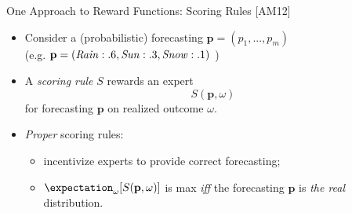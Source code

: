 \begin{frame}{One Approach to Reward Functions: Scoring Rules [AM12]}

\begin{itemize}[<+- | alert@+>]
	\item Consider a (probabilistic) forecasting $\textbf{p} = (p_1,...,p_m)$ \\
	(e.g. $\textbf{p} = (\text{\emph{Rain}} : .6, \text{\emph{Sun}} : .3, \text{\emph{Snow}} : .1)$ )
	\item A \emph{scoring rule} $S$ rewards an expert 
	$$ S(\textbf{p}, \omega) $$ 
	for forecasting $\textbf{p}$ on realized outcome $\omega$.
	\item \emph{Proper} scoring rules: 
	\begin{itemize}
		\item incentivize experts to provide correct forecasting;
		\item $\expectation_{\omega}[S(\textbf{p}, \omega)]$ is max \emph{iff} the forecasting $\textbf{p}$ is \emph{the real} distribution.
	\end{itemize}
	
\end{itemize}

\onslide<+->

\end{frame}

